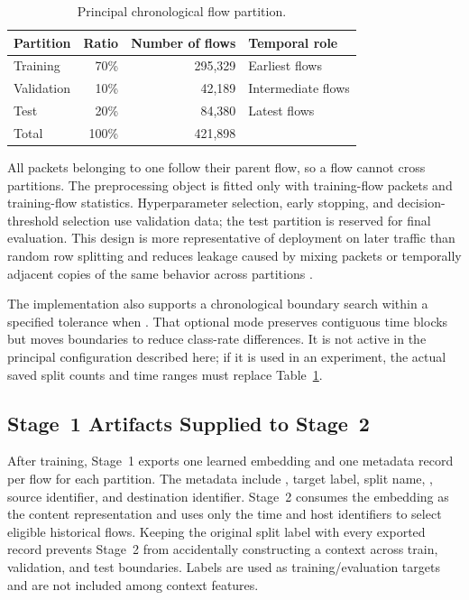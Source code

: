 \begin{table}[t]
    \centering
    \caption{Principal chronological flow partition.}
    \label{tab:chronological_split}
    \begin{tabular}{@{}lrrl@{}}
        \toprule
        Partition & Ratio & Number of flows & Temporal role \\
        \midrule
        Training & 70\% & 295,329 & Earliest flows \\
        Validation & 10\% & 42,189 & Intermediate flows \\
        Test & 20\% & 84,380 & Latest flows \\
        \midrule
        Total & 100\% & 421,898 & \\
        \bottomrule
    \end{tabular}
\end{table}

All packets belonging to one  follow their parent flow,
so a flow cannot cross partitions. The preprocessing object is fitted only
with training-flow packets and training-flow statistics. Hyperparameter
selection, early stopping, and decision-threshold selection use validation
data; the test partition is reserved for final evaluation. This design is more
representative of deployment on later traffic than random row splitting and
reduces leakage caused by mixing packets or temporally adjacent copies of the
same behavior across partitions \cite{SommerPaxson2010,Arp2022DosDonts}.

The implementation also supports a chronological boundary search within a
specified tolerance when . That optional mode
preserves contiguous time blocks but moves boundaries to reduce class-rate
differences. It is not active in the principal configuration described here;
if it is used in an experiment, the actual saved split counts and time ranges
must replace Table~\ref{tab:chronological_split}.

\subsection{Stage~1 Artifacts Supplied to Stage~2}
\label{subsec:stage2_artifacts}

After training, Stage~1 exports one learned embedding and one metadata record
per flow for each partition. The metadata include
, target label, split name,
, source identifier, and destination
identifier. Stage~2 consumes the embedding as the content representation and
uses only the time and host identifiers to select eligible historical flows.
Keeping the original split label with every exported record prevents Stage~2
from accidentally constructing a context across train, validation, and test
boundaries. Labels are used as training/evaluation targets and are not included
among context features.

